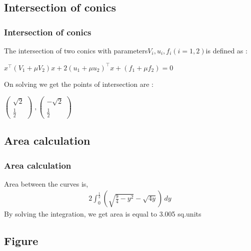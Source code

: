 \documentclass{beamer}
\providecommand{\brak}[1]{\ensuremath{\left(#1\right)}}
\theoremstyle{remark}
\newcommand{\myvec}[1]{\ensuremath{\begin{pmatrix}#1\end{pmatrix}}}
\numberwithin{equation}{section}
\begin{document}
\subsection{Intersection of conics}
\begin{frame}
\frametitle{Intersection of conics}
The intersection of two conics with parameters$ V_i, u_i, f_i (i = 1, 2) $is defined as :
\begin{center}
    $x^\top (V_1 + \mu V_2) x + 2(u_1 + \mu u_2)^\top x + (f_1 + \mu f_2) = 0$
\end{center}

On solving we get the points of intersection are :
\begin{center}
    $\myvec{\sqrt{2}\\\frac{1}{2}}\;,\myvec{-\sqrt{2}\\\frac{1}{2}}$
\end{center}

\end{frame}
\subsection{Area calculation}
\begin{frame}
\frametitle{Area calculation}
Area between the curves is,
\begin{align}
2\int_{0}^{\frac{1}{2}} \brak{\sqrt{\frac{9}{4}-y^2}-\sqrt{4y}} \, dy 
\end{align}
By solving the integration, we get area is equal to 3.005 sq.units
\end{frame}

\subsection{Figure}
\end{document}
